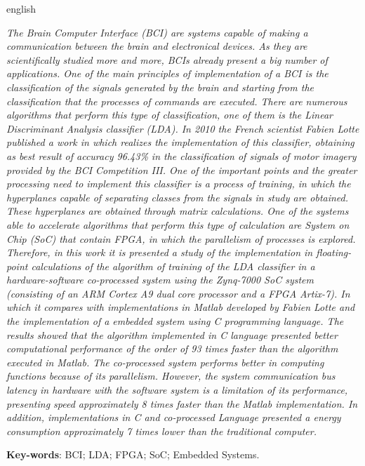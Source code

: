 \begin{resumo}[Abstract]
 \begin{otherlanguage*}{english}

   \vspace{\onelineskip}
 	\textit{The Brain Computer Interface (BCI) are systems capable of making a communication between the brain and electronical devices. As they are scientifically studied more and more, BCIs already present a big number of applications. One of the main principles of implementation of a BCI is the classification of the signals generated by the brain and starting from the classification that the processes of commands are executed. There are numerous algorithms that perform this type of classification, one of them is the Linear Discriminant Analysis classifier (LDA). In 2010 the French scientist Fabien Lotte published a work in which realizes the implementation of this classifier, obtaining as best result of accuracy 96.43\% in the classification of signals of motor imagery provided by the BCI Competition III. One of the important points and the greater processing need to implement this classifier is a process of training, in which the hyperplanes capable of separating classes from the signals in study are obtained. These hyperplanes are obtained through matrix calculations. One of the systems able to accelerate algorithms that perform this type of calculation are System on Chip (SoC) that contain FPGA, in which the parallelism of processes is explored. Therefore, in this work it is presented a study of the implementation in floating-point calculations of the algorithm of training of the LDA classifier in a hardware-software co-processed system using the Zynq-7000 SoC system (consisting of an ARM Cortex A9 dual core processor and a FPGA Artix-7).  In which it compares with implementations in Matlab developed by Fabien Lotte and the implementation of a embedded system using C programming language. The results showed that the algorithm implemented in C language presented better computational performance of the order of 93 times faster than the algorithm executed in Matlab. The co-processed system performs better in computing functions because of its parallelism. However, the system communication bus latency in hardware with the software system is a limitation of its performance, presenting speed approximately 8 times faster than the Matlab implementation. In addition, implementations in C and co-processed Language presented a energy consumption approximately 7 times lower than the traditional computer.}
 	
   \noindent 
   \textbf{Key-words}: BCI; LDA; FPGA; SoC; Embedded Systems.
 \end{otherlanguage*}
\end{resumo}
